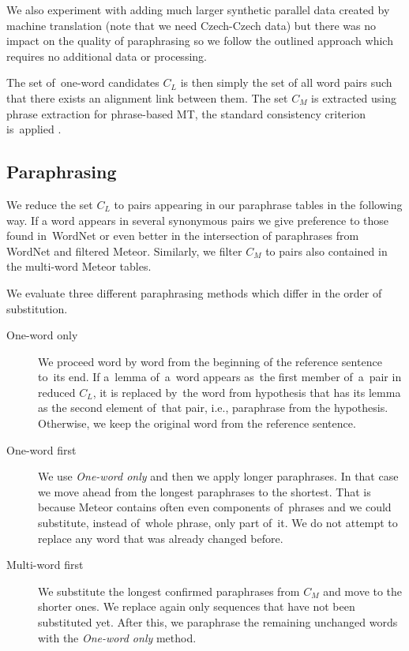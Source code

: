 \documentclass[11pt]{article}
\begin{document}
We also experiment with adding much larger synthetic parallel data created by
machine translation (note that we need Czech-Czech data) but there was no 
impact on the quality of paraphrasing so we follow the outlined approach which 
requires no additional data or processing.

The set of~one-word candidates $C_L$ is then simply the set of all word pairs 
such that there exists an alignment link between them. The set $C_M$ is 
extracted using phrase extraction for phrase-based MT, the standard consistency 
criterion is~applied \cite{Och99improvedalignment}.

\subsection{Paraphrasing}
We reduce the set $ C_{L} $ to pairs appearing in our paraphrase tables in the 
following way. If a word appears in several synonymous pairs we give preference 
to those found in~WordNet or even better in the intersection of paraphrases 
from WordNet and filtered Meteor. Similarly, we filter $ C_{M} $ to pairs also 
contained in the multi-word Meteor tables.

We evaluate three different paraphrasing methods which differ in the order of
substitution.

\begin{description}
\item[One-word only] We proceed word by word from the beginning of the reference 
sentence to~its end. If a~lemma of~a~word appears as~the first member of~a~pair 
in reduced $ C_{L} $, it is replaced by~the word from hypothesis that has its lemma
as the second element of~that pair, i.e., paraphrase from the hypothesis. Otherwise, 
we keep the original word from the reference sentence.
\item[One-word first] We use \textit{One-word only} and then we apply longer paraphrases.
In that case we move ahead from the longest paraphrases to the shortest. That is because 
Meteor contains often even components of~phrases and we could substitute, instead of~whole 
phrase, only part of~it. We do not attempt to replace any word that was already changed 
before.
\item[Multi-word first] We substitute the longest confirmed paraphrases from
$ C_{M} $ and move to the shorter ones. We replace again only sequences that have not
been substituted yet. After this, we paraphrase the remaining unchanged words
with the \textit{One-word only} method.
\end{description}
\end{document}
